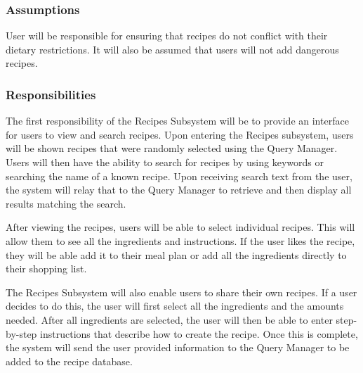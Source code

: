 \subsubsection{Assumptions}
User will be responsible for ensuring that recipes do not conflict with their dietary restrictions. It will also be assumed that users will not add dangerous recipes.

\subsubsection{Responsibilities}
The first responsibility of the Recipes Subsystem will be to provide an interface for users to view and search recipes. Upon entering the Recipes subsystem, users will be shown recipes that were randomly selected using the Query Manager. Users will then have the ability to search for recipes by using keywords or searching the name of a known recipe. Upon receiving search text from the user, the system will relay that to the Query Manager to retrieve and then display all results matching the search. 

After viewing the recipes, users will be able to select individual recipes. This will allow them to see all the ingredients and instructions. If the user likes the recipe, they will be able add it to their meal plan or add all the ingredients directly to their shopping list.

The Recipes Subsystem will also enable users to share their own recipes. If a user decides to do this, the user will first select all the ingredients and the amounts needed. After all ingredients are selected, the user will then be able to enter step-by-step instructions that describe how to create the recipe. Once this is complete, the system will send the user provided information to the Query Manager to be added to the recipe database.

